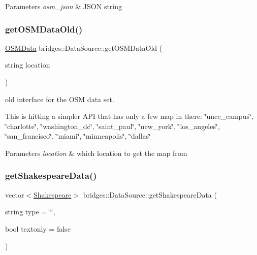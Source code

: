 \begin{DoxyParams}{Parameters}
{\em osm\+\_\+json} & J\+S\+ON string \\
\hline
\end{DoxyParams}
\mbox{\label{classbridges_1_1_data_source_a3ae5e11e0b70bed0498cf37b360820c2}} 
\subsubsection{\texorpdfstring{get\+O\+S\+M\+Data\+Old()}{getOSMDataOld()}}
{\footnotesize\ttfamily \mbox{\hyperlink{classbridges_1_1dataset_1_1_o_s_m_data}{O\+S\+M\+Data}} bridges\+::\+Data\+Source\+::get\+O\+S\+M\+Data\+Old (\begin{DoxyParamCaption}\item[{string}]{location }\end{DoxyParamCaption})\hspace{0.3cm}{\ttfamily [inline]}}



old interface for the O\+SM data set. 

This is hitting a simpler A\+PI that has only a few map in there\+: \char`\"{}uncc\+\_\+campus\char`\"{}, \char`\"{}charlotte\char`\"{}, \char`\"{}washington\+\_\+dc\char`\"{}, \char`\"{}saint\+\_\+paul\char`\"{}, \char`\"{}new\+\_\+york\char`\"{}, \char`\"{}los\+\_\+angeles\char`\"{}, \char`\"{}san\+\_\+francisco\char`\"{}, \char`\"{}miami\char`\"{}, \char`\"{}minneapolis\char`\"{}, \char`\"{}dallas\char`\"{}


\begin{DoxyParams}{Parameters}
{\em location} & which location to get the map from \\
\hline
\end{DoxyParams}
\mbox{\label{classbridges_1_1_data_source_a8b73299a4c1c71d2e32431a8d4a7be81}} 
\subsubsection{\texorpdfstring{get\+Shakespeare\+Data()}{getShakespeareData()}}
{\footnotesize\ttfamily vector$<$\mbox{\hyperlink{classbridges_1_1dataset_1_1_shakespeare}{Shakespeare}}$>$ bridges\+::\+Data\+Source\+::get\+Shakespeare\+Data (\begin{DoxyParamCaption}\item[{string}]{type = {\ttfamily \char`\"{}\char`\"{}},  }\item[{bool}]{textonly = {\ttfamily false} }\end{DoxyParamCaption})\hspace{0.3cm}{\ttfamily [inline]}}



